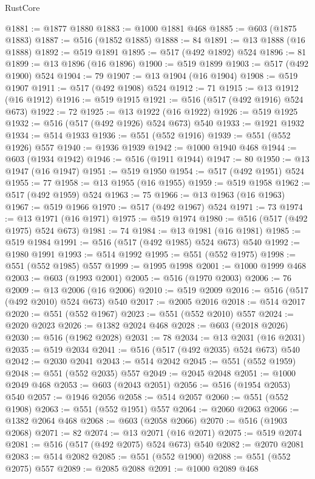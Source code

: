 \begin{lexlean}{RustCore}
\begin{coremodule}
@1881 := @1877 @1880
@1883 := @1000 @1881 @468
@1885 := @603 (@1875 @1883)
@1887 := @516 (@1852 @1885)
@1888 := 84
@1891 := @13 @1888 (@16 @1888)
@1892 := @519 @1891
@1895 := @517 (@492 @1892) @524
@1896 := 81
@1899 := @13 @1896 (@16 @1896)
@1900 := @519 @1899
@1903 := @517 (@492 @1900) @524
@1904 := 79
@1907 := @13 @1904 (@16 @1904)
@1908 := @519 @1907
@1911 := @517 (@492 @1908) @524
@1912 := 71
@1915 := @13 @1912 (@16 @1912)
@1916 := @519 @1915
@1921 := @516 (@517 (@492 @1916) @524 @673)
@1922 := 72
@1925 := @13 @1922 (@16 @1922)
@1926 := @519 @1925
@1932 := @516 (@517 (@492 @1926) @524 @673) @540
@1933 := @1921 @1932
@1934 := @514 @1933
@1936 := @551 (@552 @1916)
@1939 := @551 (@552 @1926) @557
@1940 := @1936 @1939
@1942 := @1000 @1940 @468
@1944 := @603 (@1934 @1942)
@1946 := @516 (@1911 @1944)
@1947 := 80
@1950 := @13 @1947 (@16 @1947)
@1951 := @519 @1950
@1954 := @517 (@492 @1951) @524
@1955 := 77
@1958 := @13 @1955 (@16 @1955)
@1959 := @519 @1958
@1962 := @517 (@492 @1959) @524
@1963 := 75
@1966 := @13 @1963 (@16 @1963)
@1967 := @519 @1966
@1970 := @517 (@492 @1967) @524
@1971 := 73
@1974 := @13 @1971 (@16 @1971)
@1975 := @519 @1974
@1980 := @516 (@517 (@492 @1975) @524 @673)
@1981 := 74
@1984 := @13 @1981 (@16 @1981)
@1985 := @519 @1984
@1991 := @516 (@517 (@492 @1985) @524 @673) @540
@1992 := @1980 @1991
@1993 := @514 @1992
@1995 := @551 (@552 @1975)
@1998 := @551 (@552 @1985) @557
@1999 := @1995 @1998
@2001 := @1000 @1999 @468
@2003 := @603 (@1993 @2001)
@2005 := @516 (@1970 @2003)
@2006 := 76
@2009 := @13 @2006 (@16 @2006)
@2010 := @519 @2009
@2016 := @516 (@517 (@492 @2010) @524 @673) @540
@2017 := @2005 @2016
@2018 := @514 @2017
@2020 := @551 (@552 @1967)
@2023 := @551 (@552 @2010) @557
@2024 := @2020 @2023
@2026 := @1382 @2024 @468
@2028 := @603 (@2018 @2026)
@2030 := @516 (@1962 @2028)
@2031 := 78
@2034 := @13 @2031 (@16 @2031)
@2035 := @519 @2034
@2041 := @516 (@517 (@492 @2035) @524 @673) @540
@2042 := @2030 @2041
@2043 := @514 @2042
@2045 := @551 (@552 @1959)
@2048 := @551 (@552 @2035) @557
@2049 := @2045 @2048
@2051 := @1000 @2049 @468
@2053 := @603 (@2043 @2051)
@2056 := @516 (@1954 @2053) @540
@2057 := @1946 @2056
@2058 := @514 @2057
@2060 := @551 (@552 @1908)
@2063 := @551 (@552 @1951) @557
@2064 := @2060 @2063
@2066 := @1382 @2064 @468
@2068 := @603 (@2058 @2066)
@2070 := @516 (@1903 @2068)
@2071 := 82
@2074 := @13 @2071 (@16 @2071)
@2075 := @519 @2074
@2081 := @516 (@517 (@492 @2075) @524 @673) @540
@2082 := @2070 @2081
@2083 := @514 @2082
@2085 := @551 (@552 @1900)
@2088 := @551 (@552 @2075) @557
@2089 := @2085 @2088
@2091 := @1000 @2089 @468

\end{coremodule}
\end{lexlean}
